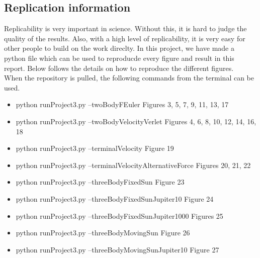 \documentclass{article}
\begin{document}
\subsection{Replication information}
Replicability is very important in science. Without this, it is hard to judge the quality of the results. Also, with a high level of replicability, it is very easy for other people to build on the work direclty. In this project, we have made a python file which can be used to reproducde every figure and result in this report. Below follows the details on how to reproduce the different figures.\\

When the repository is pulled, the following commands from the terminal can be used.

\begin{itemize}
	\item  \colorbox{gray!30}{python runProject3.py --twoBodyFEuler} Figures 3, 5, 7, 9, 11, 13, 17\\
	
	\item  \colorbox{gray!30}{python runProject3.py --twoBodyVelocityVerlet} Figures 4, 6, 8, 10, 12, 14, 16, 18\\
	
	\item  \colorbox{gray!30}{python runProject3.py 	--terminalVelocity} Figure 19\\
	
	\item  \colorbox{gray!30}{python runProject3.py --terminalVelocityAlternativeForce} Figures 20, 21, 22\\
	
	\item  \colorbox{gray!30}{python runProject3.py --threeBodyFixedSun} Figure 23\\
	
	\item  \colorbox{gray!30}{python runProject3.py --threeBodyFixedSunJupiter10} Figure 24\\
	
	\item  \colorbox{gray!30}{python runProject3.py --threeBodyFixedSunJupiter1000} Figures 25\\
	
	\item  \colorbox{gray!30}{python runProject3.py --threeBodyMovingSun} Figure 26\\
	
	\item  \colorbox{gray!30}{python runProject3.py --threeBodyMovingSunJupiter10} Figure 27\\
	

\end{itemize}
\end{document}
